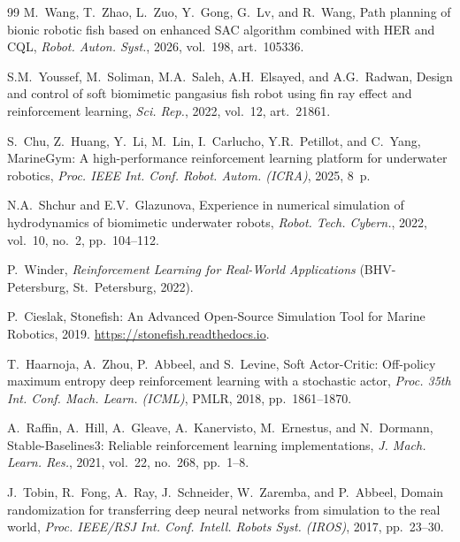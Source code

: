 \documentclass[12pt]{revtex4}
\begin{document}
\begin{thebibliography}{99}
M.~Wang, T.~Zhao, L.~Zuo, Y.~Gong, G.~Lv, and R.~Wang, Path
planning of bionic robotic fish based on enhanced SAC algorithm
combined with HER and CQL, {\it Robot. Auton. Syst.}, 2026,
vol.~198, art.~105336.

S.M.~Youssef, M.~Soliman, M.A.~Saleh, A.H.~Elsayed, and
A.G.~Radwan, Design and control of soft biomimetic pangasius fish
robot using fin ray effect and reinforcement learning,
{\it Sci. Rep.}, 2022, vol.~12, art.~21861.

S.~Chu, Z.~Huang, Y.~Li, M.~Lin, I.~Carlucho, Y.R.~Petillot, and
C.~Yang, MarineGym: A high-performance reinforcement learning
platform for underwater robotics, {\it Proc. IEEE Int. Conf.
Robot. Autom. (ICRA)}, 2025, 8~p.

N.A.~Shchur and E.V.~Glazunova, Experience in numerical
simulation of hydrodynamics of biomimetic underwater robots,
{\it Robot. Tech. Cybern.}, 2022, vol.~10, no.~2, pp.~104--112.

P.~Winder, {\it Reinforcement Learning for Real-World
Applications} (BHV-Petersburg, St.~Petersburg, 2022).

P.~Cieslak, Stonefish: An Advanced Open-Source Simulation Tool for 
Marine Robotics, 2019. 
\url{https://stonefish.readthedocs.io}.

T.~Haarnoja, A.~Zhou, P.~Abbeel, and S.~Levine, Soft
Actor-Critic: Off-policy maximum entropy deep reinforcement
learning with a stochastic actor, {\it Proc. 35th Int. Conf.
Mach. Learn. (ICML)}, PMLR, 2018, pp.~1861--1870.

A.~Raffin, A.~Hill, A.~Gleave, A.~Kanervisto, M.~Ernestus, and
N.~Dormann, Stable-Baselines3: Reliable reinforcement learning
implementations, {\it J. Mach. Learn. Res.}, 2021, vol.~22,
no.~268, pp.~1--8.

J.~Tobin, R.~Fong, A.~Ray, J.~Schneider, W.~Zaremba, and
P.~Abbeel, Domain randomization for transferring deep neural
networks from simulation to the real world, {\it Proc. IEEE/RSJ
Int. Conf. Intell. Robots Syst. (IROS)}, 2017, pp.~23--30.

\end{thebibliography}
\end{document}
